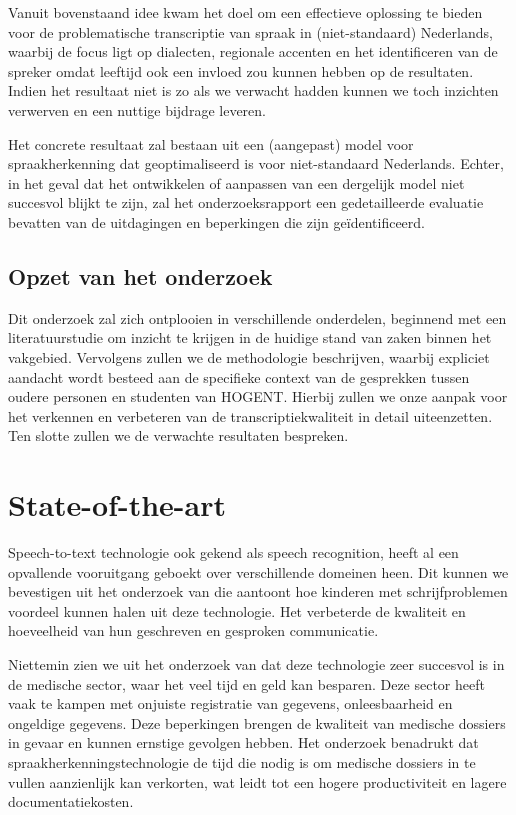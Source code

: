 Vanuit bovenstaand idee kwam het doel om een effectieve oplossing te bieden voor de problematische transcriptie van spraak in (niet-standaard) Nederlands, waarbij de focus ligt op dialecten, regionale accenten en het identificeren van de spreker omdat leeftijd ook een invloed zou kunnen hebben op de resultaten. Indien het resultaat niet is zo als we verwacht hadden kunnen we toch inzichten verwerven en een nuttige bijdrage leveren.

Het concrete resultaat zal bestaan uit een (aangepast) model voor spraakherkenning dat geoptimaliseerd is voor niet-standaard Nederlands. Echter, in het geval dat het ontwikkelen of aanpassen van een dergelijk model niet succesvol blijkt te zijn, zal het onderzoeksrapport een gedetailleerde evaluatie bevatten van de uitdagingen en beperkingen die zijn geïdentificeerd.

\subsection{Opzet van het onderzoek}
Dit onderzoek zal zich ontplooien in verschillende onderdelen, beginnend met een literatuurstudie om inzicht te krijgen in de huidige stand van zaken binnen het vakgebied. Vervolgens zullen we de methodologie beschrijven, waarbij expliciet aandacht wordt besteed aan de specifieke context van de gesprekken tussen oudere personen en studenten van HOGENT. Hierbij zullen we onze aanpak voor het verkennen en verbeteren van de transcriptiekwaliteit in detail uiteenzetten. Ten slotte zullen we de verwachte resultaten bespreken.


\section{State-of-the-art}%
\label{sec:state-of-the-art}
Speech-to-text technologie ook gekend als speech recognition, heeft al een opvallende vooruitgang geboekt over verschillende domeinen heen. Dit kunnen we bevestigen uit het onderzoek van \autocite{Kambouri2023} die aantoont hoe kinderen met schrijfproblemen voordeel kunnen halen uit deze technologie. Het verbeterde de kwaliteit en hoeveelheid van hun geschreven en gesproken communicatie.

Niettemin zien we uit het onderzoek van \autocite{ajami2016use} dat deze technologie zeer succesvol is in de medische sector, waar het veel tijd en geld kan besparen. Deze sector heeft vaak te kampen met onjuiste registratie van gegevens, onleesbaarheid en ongeldige gegevens. Deze beperkingen brengen de kwaliteit van medische dossiers in gevaar en kunnen ernstige gevolgen hebben. Het onderzoek benadrukt dat spraakherkenningstechnologie de tijd die nodig is om medische dossiers in te vullen aanzienlijk kan verkorten, wat leidt tot een hogere productiviteit en lagere documentatiekosten.

